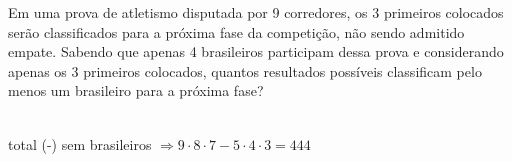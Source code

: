 \begin{ex}
Em uma prova de atletismo disputada por 9 corredores, os 3 primeiros colocados serão classificados para a próxima fase da competição, não sendo admitido empate. Sabendo que apenas 4 brasileiros participam dessa prova e considerando apenas os 3 primeiros colocados, quantos resultados possíveis classificam pelo menos um brasileiro para a próxima fase?
  \begin{sol}
      \phantom{A} \\
      total (-) sem brasileiros $\Longrightarrow 9\cdot8\cdot7 - 5\cdot4\cdot3=444$
  \end{sol}
\end{ex}